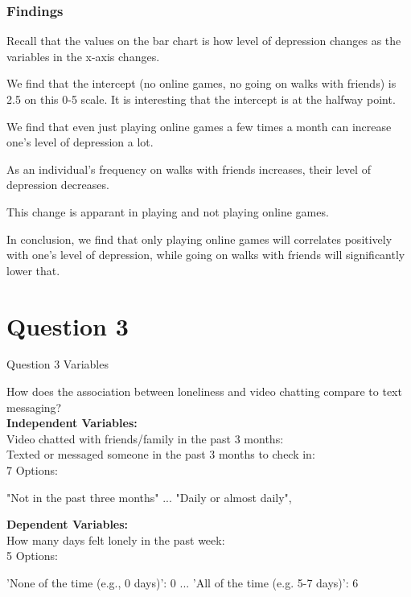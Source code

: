 \documentclass{beamer}
\begin{document}
\begin{frame}
    \frametitle{Findings}

    Recall that the values on the bar chart is how level of depression changes as the variables in the x-axis changes.

    We find that the intercept (no online games, no going on walks with friends) is 2.5 on this 0-5 scale. It is interesting that the intercept is at the halfway point.
    
    We find that even just playing online games a few times a month can increase one's level of depression a lot.

    As an individual's frequency on walks with friends increases, their level of depression decreases.

    This change is apparant in playing and not playing online games.

    In conclusion, we find that only playing online games will correlates positively with one's level of depression, while going on walks with friends will significantly lower that.

\end{frame}






\section{Question 3}
\begin{frame}{Question 3 Variables}

\small %
How does the association between loneliness and video chatting compare
to text messaging?\\

\vspace{0.5em} %
\textbf{Independent Variables:}\\
\vspace{0.2em}
Video chatted with friends/family in the past 3 months:\\
Texted or messaged someone in the past 3 months to check in:\\

\vspace{0.5em}
7 Options:
\begin{itemize}
    "Not in the past three months" ...
    "Daily or almost daily",
\end{itemize}

\vspace{0.5em}
\textbf{Dependent Variables:}\\
\vspace{0.2em}
How many days felt lonely in the past week:\\

\vspace{0.5em}
5 Options:
\begin{itemize}
    'None of the time (e.g., 0 days)': 0 ... 'All of the time (e.g. 5-7 days)': 6
\end{itemize}

\end{frame}
\end{document}
